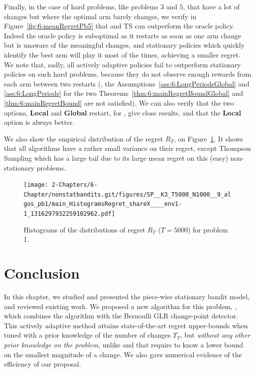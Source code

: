 Finally, in the case of hard problems, like problems $3$ and $5$, that have a lot of changes but where the optimal arm barely changes, we verify in Figure~\ref{fig:6:meanRegretPb5} that \klUCB{} and TS can outperform the oracle policy.
Indeed the oracle policy is suboptimal as it restarts as soon as one arm change but is unaware of the meaningful changes, and stationary policies which quickly identify the best arm will play it most of the times, achieving a smaller regret.
We note that, sadly, all actively adaptive policies fail to outperform stationary policies on such hard problems, because they do not observe enough rewards from each arm between two restarts (\ie, the Assumptions~\ref{ass:6:LongPeriodsGlobal} and \ref{ass:6:LongPeriods} for the two Theorems~\ref{thm:6:mainRegretBoundGlobal} and \ref{thm:6:mainRegretBound} are not satisfied).
We can also verify that the two options, \textbf{Local} and \textbf{Global} restart, for \GLRklUCB, give close results, and that the \textbf{Local} option is always better.

We also show the empirical distribution of the regret $R_T$, on Figure~\ref{fig:6:histogramRegretPb1}. It shows that all algorithms have a rather small variance on their regret, except Thompson Sampling which has a large tail due to its large mean regret on this (easy) non-stationary problems.

\begin{figure}[h!]  %
    \centering
    \texttt{[image: 2-Chapters/6-Chapter/nonstatbandits.git/figures/SP\_\_K3\_T5000\_N1000\_\_9\_algos\_pb1/main\_HistogramsRegret\_shareX\_\_\_\_env1-1\_1316297932259102962.pdf]}
    \caption{Histograms of the distributions of regret $R_T$ ($T=5000$) for problem 1.}
    \label{fig:6:histogramRegretPb1}
\end{figure}


\newpage
\section{Conclusion}
\label{sub:6:conclusion}

In this chapter, we studied and presented the piece-wise stationary bandit model, and reviewed existing work.
%
We proposed a new algorithm for this problem, \GLRklUCB, which combines the \klUCB{} algorithm with the Bernoulli GLR change-point detector. This actively adaptive method attains state-of-the-art regret upper-bounds when tuned with a prior knowledge of the number of changes $\Upsilon_T$, but \emph{without any other prior knowledge on the problem}, unlike \CUSUMUCB{} and \MUCB{} that require to know a lower bound on the smallest magnitude of a change. We also gave numerical evidence of the efficiency of our proposal.

